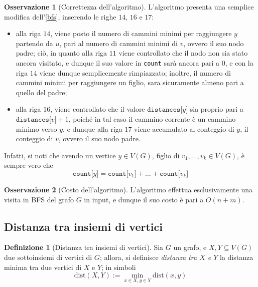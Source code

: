 \documentclass[14pt]{extreport}
\theoremstyle{definition}
\newtheorem{definition}{Definizione}[subsection]
\theoremstyle{definition}
\newtheorem{remark}{Osservazione}[subsection]
\begin{document}
\begin{remark}[Correttezza dell'algoritmo]
    L'algoritmo presenta una semplice modifica dell'\cref{bfs}, inserendo le righe $14$, $16$ e $17$:

    \begin{itemize}
        \item alla riga $14$, viene posto il numero di cammini minimi per raggiungere $y$ partendo da $u$, pari al numero di cammini minimi di $v$, ovvero il suo nodo padre; ciò, in quanto alla riga $11$ viene controllato che il nodo non sia stato ancora visitato, e dunque il suo valore in \texttt{count} sarà ancora pari a $0$, e con la riga $14$ viene dunque semplicemente rimpiazzato; inoltre, il numero di cammini minimi per raggiungere un figlio, sara sicuramente almeno pari a quello del padre;
        \item alla riga $16$, viene controllato che il valore $\texttt{distances[}y\texttt{]}$ sia proprio pari a $\texttt{distances[}v\texttt{]} + 1$, poiché in tal caso il cammino corrente è un cammino minimo verso $y$, e dunque alla riga $17$ viene accumulato al conteggio di $y$, il conteggio di $v$, ovvero il suo nodo padre.
    \end{itemize}

    Infatti, si noti che avendo un vertice $y \in V(G)$, figlio di $v_1, \ldots, v_k \in V(G)$, è sempre vero che $$\texttt{count[}y\texttt{]} = \texttt{count[}v_1\texttt{]} + \ldots + \texttt{count[}v_k\texttt{]}$$
\end{remark}

\begin{remark}[Costo dell'algoritmo]
    L'algoritmo effettua esclusivamente una visita in BFS del grafo $G$ in input, e dunque il suo costo è pari a $O(n+m)$.
\end{remark}

\subsection{Distanza tra insiemi di vertici}

\begin{definition}[Distanza tra insiemi di vertici]
    Sia $G$ un grafo, e $X, Y \subseteq V(G)$ due sottoinsiemi di vertici di $G$; allora, si definisce \textit{distanza tra $X$ e $Y$} la distanza minima tra due vertici di $X$ e $Y$; in simboli $$\mathrm{dist}(X, Y) := \min_{x \in X, y \in Y}{\mathrm{dist}(x, y)}$$
\end{definition}
\end{document}
